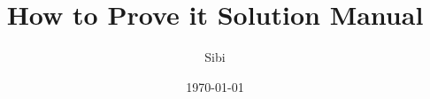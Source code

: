 \documentclass{exam}
\begin{document}
\printanswers

\title{How to Prove it Solution Manual}
\author{Sibi}
\date{\today}
\maketitle

\tableofcontents

%


%
%
%
%
\end{document}
